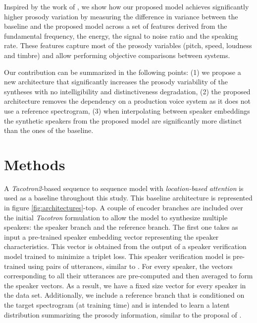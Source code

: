 Inspired by the work of \autocite{Raitio2020}, we show how our proposed model achieves significantly higher prosody variation by measuring the difference in variance between the baseline and the proposed model across a set of features derived from the fundamental frequency, the energy, the signal to noise ratio and the speaking rate. These features capture most of the prosody variables (pitch, speed, loudness and timbre) \autocite{Raitio2020} and allow performing objective comparisons between systems.

Our contribution can be summarized in the following points: (1) we propose a new architecture that significantly increases the prosody variability of the syntheses with no intelligibility and distinctiveness degradation, (2) the proposed architecture removes the dependency on a production voice system as it does not use a reference spectrogram, (3) when interpolating between speaker embeddings the synthetic speakers from the proposed model are significantly more distinct than the ones of the baseline.

\section{Methods}
A \textit{Tacotron2}-based sequence to sequence model with \textit{location-based attention} \autocite{Wang2017} is used as a baseline throughout this study. This baseline architecture is represented in figure \ref{fig:architectures}-top. A couple of encoder branches are included over the initial \textit{Tacotron} formulation to allow the model to synthesize multiple speakers: the speaker branch and the reference branch. The first one takes as input a pre-trained speaker embedding vector representing the speaker characteristics. This vector is obtained from the output of a speaker verification model trained to minimize a triplet loss. This speaker verification model is pre-trained using pairs of utterances, similar to  \autocite{Ren2019}. For every speaker, the vectors corresponding to all their utterances are pre-computed and then averaged to form the speaker vectors. As a result, we have a fixed size vector for every speaker in the data set. Additionally, we include a reference branch that is conditioned on the target spectrogram (at training time) and is intended to learn a latent distribution summarizing the prosody information, similar to the proposal of \autocite{skerryryan2018}.

